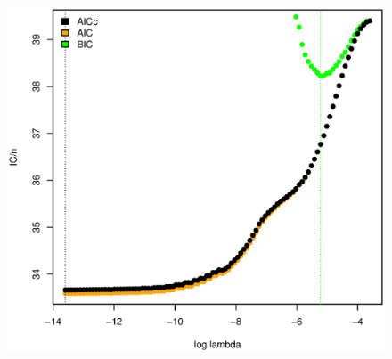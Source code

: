 \documentclass[11pt, fleqn]{article}
\begin{document}
\begin{figure}[!htb]
  \centering
  \includegraphics[scale=.5]{ic_pl_nhl_b.eps}
  \caption{}
  \label{fig:pl_ic_nhl_b}
\end{figure}



\end{document}
